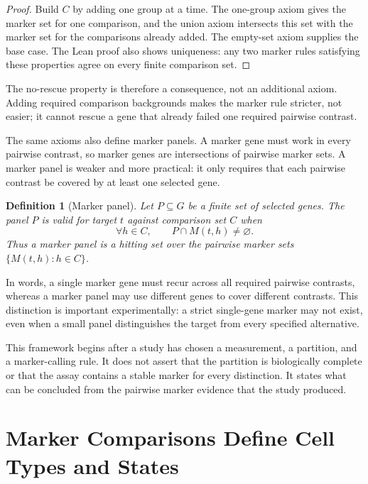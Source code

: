 \documentclass{article}
\newtheorem{definition}{Definition}
\begin{document}
\begin{proof}
Build $C$ by adding one group at a time. The one-group axiom gives the marker set for one comparison, and the union axiom intersects this set with the marker set for the comparisons already added. The empty-set axiom supplies the base case. The Lean proof also shows uniqueness: any two marker rules satisfying these properties agree on every finite comparison set.
\end{proof}

The no-rescue property is therefore a consequence, not an additional axiom. Adding required comparison backgrounds makes the marker rule stricter, not easier; it cannot rescue a gene that already failed one required pairwise contrast.

The same axioms also define marker panels. A marker gene must work in every pairwise contrast, so marker genes are intersections of pairwise marker sets. A marker panel is weaker and more practical: it only requires that each pairwise contrast be covered by at least one selected gene.

\begin{definition}[Marker panel]\label{def:marker-panel-hitting-set}
Let $P\subseteq G$ be a finite set of selected genes. The panel $P$ is valid for target $t$ against comparison set $C$ when
\[
  \forall h\in C,\qquad P\cap M(t,h)\neq\varnothing.
\]
Thus a marker panel is a hitting set over the pairwise marker sets $\{M(t,h):h\in C\}$.
\end{definition}

In words, a single marker gene must recur across all required pairwise contrasts, whereas a marker panel may use different genes to cover different contrasts. This distinction is important experimentally: a strict single-gene marker may not exist, even when a small panel distinguishes the target from every specified alternative.

This framework begins after a study has chosen a measurement, a partition, and a marker-calling rule. It does not assert that the partition is biologically complete or that the assay contains a stable marker for every distinction. It states what can be concluded from the pairwise marker evidence that the study produced.

\section{Marker Comparisons Define Cell Types and States}
\end{document}
